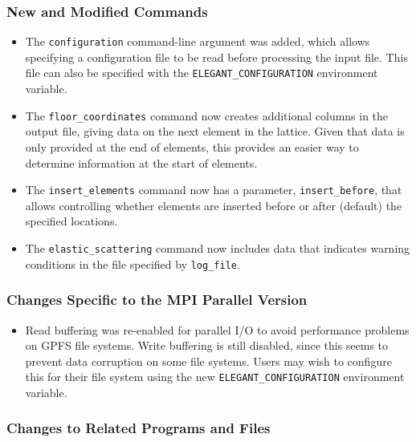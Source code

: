 \documentclass[11pt]{article}
\begin{document}
\subsubsection{New and Modified Commands}
\begin{itemize}
\item The \verb|configuration| command-line argument was added, which allows specifying a configuration file
  to be read before processing the input file. This file can also be specified with the \verb|ELEGANT_CONFIGURATION|
  environment variable.
\item The \verb|floor_coordinates| command now creates additional columns in the output file, giving data on
  the next element in the lattice. Given that data is only provided at the end of elements, this provides
  an easier way to determine information at the start of elements.
\item The \verb|insert_elements| command now has a parameter, \verb|insert_before|, that allows controlling whether
  elements are inserted before or after (default) the specified locations.
\item The \verb|elastic_scattering| command now includes data that indicates warning conditions in the file
  specified by \verb|log_file|.
\end{itemize}

\subsubsection{Changes Specific to the MPI Parallel Version}

\begin{itemize}
\item Read buffering was re-enabled for parallel I/O to avoid performance problems on GPFS file systems.
  Write buffering is still disabled, since this seems to prevent data corruption on some file systems.
  Users may wish to configure this for their file system using the new \verb|ELEGANT_CONFIGURATION| 
  environment variable.
\end{itemize}

\subsubsection{Changes to Related Programs and Files}
\end{document}

